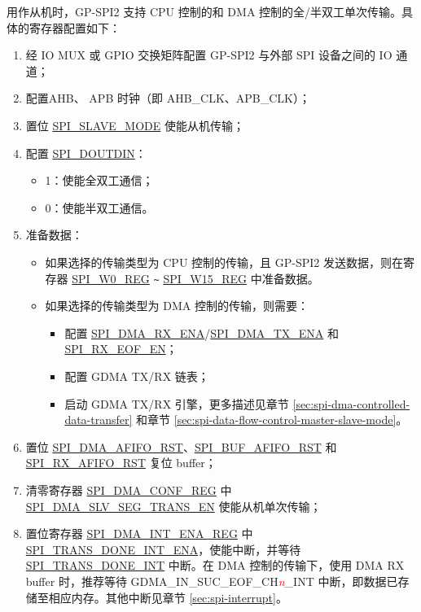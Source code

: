 \documentclass[main\_\_CN.tex]{subfiles}
\begin{document}
用作从机时，GP-SPI2 支持 CPU 控制的和 DMA 控制的全/半双工单次传输。具体的寄存器配置如下：
\begin{enumerate}
    \item 经 IO MUX 或 GPIO 交换矩阵配置 GP-SPI2 与外部 SPI 设备之间的 IO 通道；

    \item 配置AHB、 APB 时钟（即 AHB\_CLK、APB\_CLK）；

    \item 置位 \hyperref[fielddesc:SPISLAVEMODE]{SPI\_SLAVE\_MODE} 使能从机传输；

    \item 配置 \hyperref[fielddesc:SPIDOUTDIN]{SPI\_DOUTDIN}：
    \begin{itemize}
        \item 1：使能全双工通信；
        \item 0：使能半双工通信。
    \end{itemize}

    \item 准备数据：
    \begin{itemize}
        \item 如果选择的传输类型为 CPU 控制的传输，且 GP-SPI2 发送数据，则在寄存器 \hyperref[regdesc:SPIW0REG]{SPI\_W0\_REG} \verb+~+ \hyperref[regdesc:SPIW0REG]{SPI\_W15\_REG} 中准备数据。
        \item 如果选择的传输类型为 DMA 控制的传输，则需要：
        \begin{itemize}
            \item 配置 \hyperref[fielddesc:SPIDMARXENA]{SPI\_DMA\_RX\_ENA}/\hyperref[fielddesc:SPIDMATXENA]{SPI\_DMA\_TX\_ENA} 和 \hyperref[fielddesc:SPIRXEOFEN]{SPI\_RX\_EOF\_EN}；
            \item 配置 GDMA TX/RX 链表；
            \item 启动 GDMA TX/RX 引擎，更多描述见章节  \ref{sec:spi-dma-controlled-data-transfer} 和章节  \ref{sec:spi-data-flow-control-master-slave-mode}。
        \end{itemize}
    \end{itemize}

    \item 置位 \hyperref[fielddesc:SPIDMAAFIFORST]{SPI\_DMA\_AFIFO\_RST}、\hyperref[fielddesc:SPIBUFAFIFORST]{SPI\_BUF\_AFIFO\_RST} 和 \hyperref[fielddesc:SPIRXAFIFORST]{SPI\_RX\_AFIFO\_RST} 复位 buffer；

    \item 清零寄存器 \hyperref[regdesc:SPIDMACONFREG]{SPI\_DMA\_CONF\_REG} 中 \hyperref[fielddesc:SPIDMASLVSEGTRANSEN]{SPI\_DMA\_SLV\_SEG\_TRANS\_EN} 使能从机单次传输；

    \item 置位寄存器 \hyperref[regdesc:SPIDMAINTENAREG]{SPI\_DMA\_INT\_ENA\_REG} 中 \hyperref[fielddesc:SPITRANSDONEINTENA]{SPI\_TRANS\_DONE\_INT\_ENA}，使能中断，并等待 \hyperref[int:SPITRANSDONEINT]{SPI\_TRANS\_DONE\_INT} 中断。在 DMA 控制的传输下，使用 DMA RX buffer 时，推荐等待 GDMA\_IN\_SUC\_EOF\_CH\textcolor{red}{\it{n}}\_INT 中断，即数据已存储至相应内存。其他中断见章节 \ref{sec:spi-interrupt}。
\end{enumerate}
\end{document}

